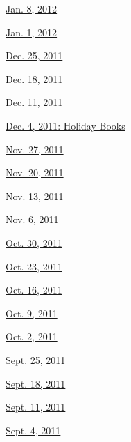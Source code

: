 \href{http://www.nytimes3xbfgragh.onion/indexes/2012/01/08/books/review/index.html}{Jan.
8, 2012}

\href{http://www.nytimes3xbfgragh.onion/indexes/2012/01/01/books/review/index.html}{Jan.
1, 2012}

\href{http://www.nytimes3xbfgragh.onion/indexes/2011/12/25/books/review/index.html}{Dec.
25, 2011}

\href{http://www.nytimes3xbfgragh.onion/indexes/2011/12/18/books/review/index.html}{Dec.
18, 2011}

\href{http://www.nytimes3xbfgragh.onion/indexes/2011/12/11/books/review/index.html}{Dec.
11, 2011}

\href{http://www.nytimes3xbfgragh.onion/indexes/2011/12/04/books/review/index.html}{Dec.
4, 2011: Holiday Books}

\href{http://www.nytimes3xbfgragh.onion/indexes/2011/11/27/books/review/index.html}{Nov.
27, 2011}

\href{http://www.nytimes3xbfgragh.onion/indexes/2011/11/20/books/review/index.html}{Nov.
20, 2011}

\href{http://www.nytimes3xbfgragh.onion/indexes/2011/11/13/books/review/index.html}{Nov.
13, 2011}

\href{http://www.nytimes3xbfgragh.onion/indexes/2011/11/05/books/review/index.html}{Nov.
6, 2011}

\href{http://www.nytimes3xbfgragh.onion/indexes/2011/10/28/books/review/index.html}{Oct.
30, 2011}

\href{http://www.nytimes3xbfgragh.onion/indexes/2011/10/21/books/review/index.html}{Oct.
23, 2011}

\href{http://www.nytimes3xbfgragh.onion/indexes/2011/10/14/books/review/index.html}{Oct.
16, 2011}

\href{http://www.nytimes3xbfgragh.onion/indexes/2011/10/07/books/review/index.html}{Oct.
9, 2011}

\href{http://www.nytimes3xbfgragh.onion/indexes/2011/09/30/books/review/index.html}{Oct.
2, 2011}

\href{http://www.nytimes3xbfgragh.onion/indexes/2011/09/23/books/review/index.html}{Sept.
25, 2011}

\href{http://www.nytimes3xbfgragh.onion/indexes/2011/09/16/books/review/index.html}{Sept.
18, 2011}

\href{http://www.nytimes3xbfgragh.onion/indexes/2011/09/09/books/review/index.html}{Sept.
11, 2011}

\href{http://www.nytimes3xbfgragh.onion/indexes/2011/09/02/books/review/index.html}{Sept.
4, 2011}

